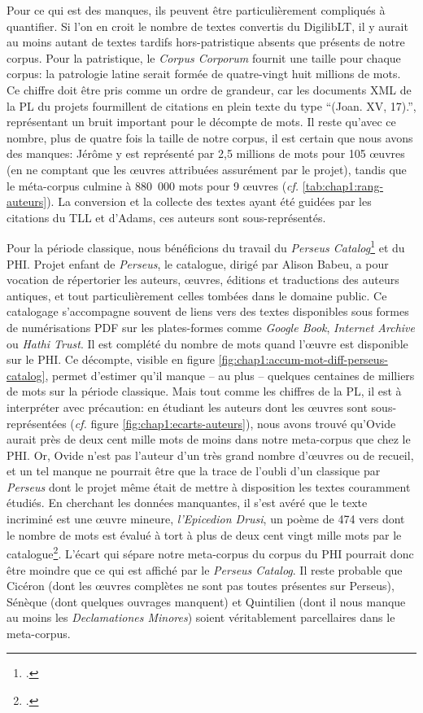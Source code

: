 Pour ce qui est des manques, ils peuvent être particulièrement compliqués à quantifier. Si l'on en croit le nombre de textes convertis du DigilibLT, il y aurait au moins autant de textes tardifs hors-patristique absents que présents de notre corpus. Pour la patristique, le \textit{Corpus Corporum} fournit une taille pour chaque corpus: la patrologie latine serait formée de quatre-vingt huit millions de mots. Ce chiffre doit être pris comme un ordre de grandeur, car les documents XML de la PL du projets fourmillent de citations en plein texte du type \enquote{(Joan. XV, 17).}, représentant un bruit important pour le décompte de mots. Il reste qu'avec ce nombre, plus de quatre fois la taille de notre corpus, il est certain que nous avons des manques: Jérôme y est représenté par 2,5 millions de mots pour 105 œuvres (en ne comptant que les œuvres attribuées assurément par le projet), tandis que le méta-corpus culmine à 880~000 mots pour 9 œuvres (\textit{cf.} \ref{tab:chap1:rang-auteurs}). La conversion et la collecte des textes ayant été guidées par les citations du TLL et d'Adams, ces auteurs sont sous-représentés.


Pour la période classique, nous bénéficions du travail du \textit{Perseus Catalog}\footcite{babeu2019perseus} et du PHI. Projet enfant de \textit{Perseus}, le catalogue, dirigé par Alison Babeu, a pour vocation de répertorier les auteurs, œuvres, éditions et traductions des auteurs antiques, et tout particulièrement celles tombées dans le domaine public. Ce catalogage s'accompagne souvent de liens vers des textes disponibles sous formes de numérisations PDF sur les plates-formes comme \textit{Google Book}, \textit{Internet Archive} ou \textit{Hathi Trust}. Il est complété du nombre de mots quand l'œuvre est disponible sur le PHI. Ce décompte, visible en figure \ref{fig:chap1:accum-mot-diff-perseus-catalog}, permet d'estimer qu'il manque -- au plus -- quelques centaines de milliers de mots sur la période classique. Mais tout comme les chiffres de la PL, il est à interpréter avec précaution: en étudiant les auteurs dont les œuvres sont sous-représentées (\textit{cf.} figure \ref{fig:chap1:ecarts-auteurs}), nous avons trouvé qu'Ovide aurait près de deux cent mille mots de moins dans notre meta-corpus que chez le PHI. Or, Ovide n'est pas l'auteur d'un très grand nombre d'œuvres ou de recueil, et un tel manque ne pourrait être que la trace de l'oubli d'un classique par \textit{Perseus} dont le projet même était de mettre à disposition les textes couramment étudiés. En cherchant les données manquantes, il s'est avéré que le texte incriminé est une œuvre mineure, \textit{l'Epicedion Drusi}, un poème de 474 vers dont le nombre de mots est évalué à tort à plus de deux cent vingt mille mots par le catalogue\footcite{clerice_catalog_dataphi0959phi015_2021}. L'écart qui sépare notre meta-corpus du corpus du PHI pourrait donc être moindre que ce qui est affiché par le \textit{Perseus Catalog}. Il reste probable que Cicéron (dont les œuvres complètes ne sont pas toutes présentes sur Perseus), Sénèque (dont quelques ouvrages manquent) et Quintilien (dont il nous manque au moins les \textit{Declamationes Minores}) soient véritablement parcellaires dans le meta-corpus.

